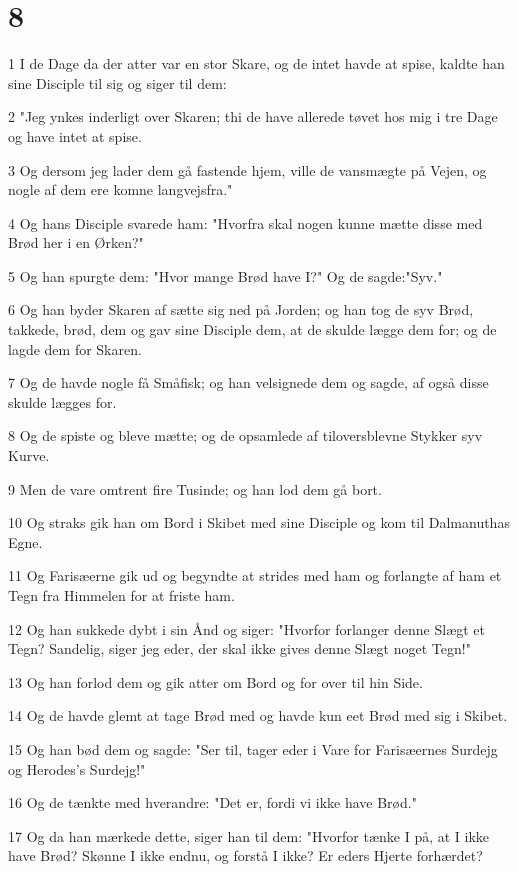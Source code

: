 \chapter{8}

\par 1 I de Dage da der atter var en stor Skare, og de intet havde at spise, kaldte han sine Disciple til sig og siger til dem:
\par 2 "Jeg ynkes inderligt over Skaren; thi de have allerede tøvet hos mig i tre Dage og have intet at spise.
\par 3 Og dersom jeg lader dem gå fastende hjem, ville de vansmægte på Vejen, og nogle af dem ere komne langvejsfra."
\par 4 Og hans Disciple svarede ham: "Hvorfra skal nogen kunne mætte disse med Brød her i en Ørken?"
\par 5 Og han spurgte dem: "Hvor mange Brød have I?" Og de sagde:"Syv."
\par 6 Og han byder Skaren af sætte sig ned på Jorden; og han tog de syv Brød, takkede, brød, dem og gav sine Disciple dem, at de skulde lægge dem for; og de lagde dem for Skaren.
\par 7 Og de havde nogle få Småfisk; og han velsignede dem og sagde, af også disse skulde lægges for.
\par 8 Og de spiste og bleve mætte; og de opsamlede af tiloversblevne Stykker syv Kurve.
\par 9 Men de vare omtrent fire Tusinde; og han lod dem gå bort.
\par 10 Og straks gik han om Bord i Skibet med sine Disciple og kom til Dalmanuthas Egne.
\par 11 Og Farisæerne gik ud og begyndte at strides med ham og forlangte af ham et Tegn fra Himmelen for at friste ham.
\par 12 Og han sukkede dybt i sin Ånd og siger: "Hvorfor forlanger denne Slægt et Tegn? Sandelig, siger jeg eder, der skal ikke gives denne Slægt noget Tegn!"
\par 13 Og han forlod dem og gik atter om Bord og for over til hin Side.
\par 14 Og de havde glemt at tage Brød med og havde kun eet Brød med sig i Skibet.
\par 15 Og han bød dem og sagde: "Ser til, tager eder i Vare for Farisæernes Surdejg og Herodes's Surdejg!"
\par 16 Og de tænkte med hverandre: "Det er, fordi vi ikke have Brød."
\par 17 Og da han mærkede dette, siger han til dem: "Hvorfor tænke I på, at I ikke have Brød? Skønne I ikke endnu, og forstå I ikke? Er eders Hjerte forhærdet?
